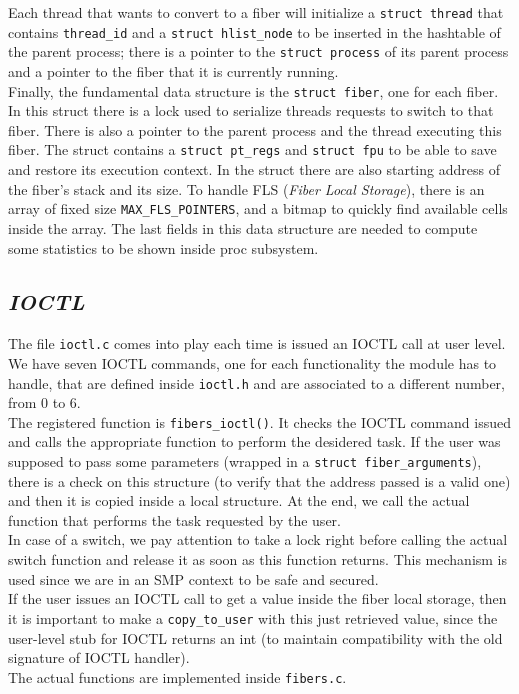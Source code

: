\documentclass[a4paper]{article}
\begin{document}
\bigskip
Each thread that wants to convert to a fiber will initialize a \texttt{struct thread} that contains \texttt{thread\_id} and a \texttt{struct hlist\_node} to be inserted in the hashtable of the parent process; there is a pointer to the \texttt{struct process} of its parent process and a pointer to the fiber that it is currently running.\bigskip\\

\bigskip
Finally, the fundamental data structure is the \texttt{struct fiber}, one for each fiber. In this struct there is a lock used to serialize threads requests to switch to that fiber. There is also a pointer to the parent process and the thread executing this fiber. The struct contains a \texttt{struct pt\_regs} and \texttt{struct fpu} to be able to save and restore its execution context. In the struct there are also starting address of the fiber's stack and its size. To handle FLS (\textit{Fiber Local Storage}), there is an array of fixed size \texttt{MAX\_FLS\_POINTERS}, and a bitmap to quickly find available cells inside the array. The last fields in this data structure are needed to compute some statistics to be shown inside proc subsystem.\bigskip\\



\subsection*{\textit{IOCTL}}
The file \texttt{ioctl.c} comes into play each time is issued an IOCTL call at user level. We have seven IOCTL commands, one for each functionality the module has to handle, that are defined inside \texttt{ioctl.h} and are associated to a different number, from 0 to 6.\bigskip\\
The registered function is \texttt{fibers\_ioctl()}. It checks the IOCTL command issued and calls the appropriate function to perform the desidered task. If the user was supposed to pass some parameters (wrapped in a \texttt{struct fiber\_arguments}), there is a check on this structure (to verify that the address passed is a valid one) and then it is copied inside a local structure. At the end, we call the actual function that performs the task requested by the user.\bigskip\\
In case of a switch, we pay attention to take a lock right before calling the actual switch function and release it as soon as this function returns. This mechanism is used since we are in an SMP context to be safe and secured.\bigskip\\
If the user issues an IOCTL call to get a value inside the fiber local storage, then it is important to make a \texttt{copy\_to\_user} with this just retrieved value, since the user-level stub for IOCTL returns an int (to maintain compatibility with the old signature of IOCTL handler).\bigskip\\
The actual functions are implemented inside \texttt{fibers.c}.
\end{document}
